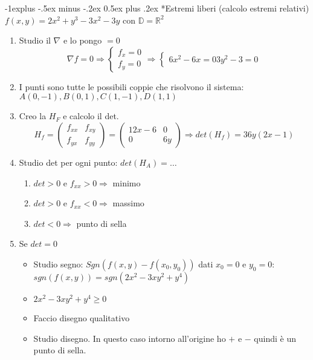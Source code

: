 \documentclass[10pt,landscape, a4paper]{article}
\makeatletter
\renewcommand{\subsection}{\@startsection{subsection}{2}{0mm}%
                                {-1explus -.5ex minus -.2ex}%
                                {0.5ex plus .2ex}%
                                {\normalfont\normalsize\bfseries}}
\makeatother
\begin{document}
\begin{multicols}{3}
\subsection*{Estremi liberi} (calcolo estremi relativi)\\
$f(x,y) = 2x^2 + y^3 -3x^2 -3y$ con $\mathbb{D} =\mathbb{R} ^2$
\begin{enumerate}
	\item Studio il $\nabla$ e lo pongo $=0$
		\begin{equation*}
			\nabla f = 0 \Rightarrow \begin{cases}
				f_x = 0\\
				f_y = 0
			\end{cases} \Rightarrow \begin{cases}
				6x^2 -6x=0
				3y^2 -3 = 0
			\end{cases}
		\end{equation*}
	\item I punti sono tutte le possibili coppie che risolvono il sistema: $A(0,-1), B(0,1), C(1,-1), D(1,1)$
	\item Creo la $H_F$ e calcolo il det.
		\begin{equation*}
			H_f = \begin{pmatrix}
				f_{xx} & f_{xy}\\
				f_{yx} & f_{yy}
			\end{pmatrix} = \begin{pmatrix}
				12x-6 & 0\\
				0 & 6y
			\end{pmatrix} \Rightarrow det(H_f) = 36y(2x-1)
		\end{equation*}
	\item Studio det per ogni punto: $det(H_A) = \dots$
		\begin{enumerate}
			\item $det > 0$ e $f_{xx} > 0 \Rightarrow$ minimo
			\item $det > 0$ e $f_{xx} < 0 \Rightarrow$ massimo
			\item $det < 0 \Rightarrow$ punto di sella
		\end{enumerate}
	\item Se $det = 0$
		\begin{itemize}
			\item Studio segno: $Sgn(f(x,y)-f(x_0,y_0))$ dati $x_0 = 0$ e $y_0 = 0$: $sgn(f(x,y)) = sgn(2x^2 -3xy^2+y^4)$
			\item $2x^2 -3xy^2+y^4 \geq 0$
			\item Faccio disegno qualitativo
			\item Studio disegno. In questo caso intorno all'origine ho $+$ e $-$ quindi è un punto di sella.
		\end{itemize}
\end{enumerate}


\end{multicols}
\end{document}
